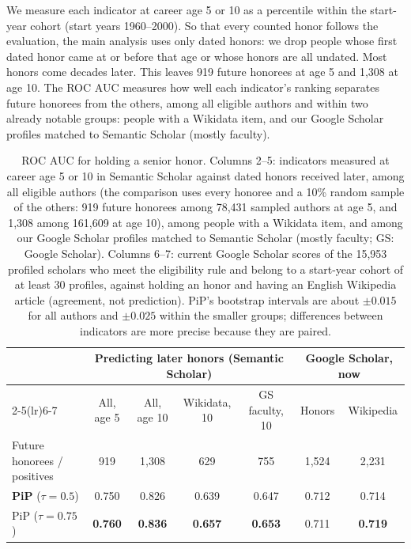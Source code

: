 \documentclass[11pt]{article}
\begin{document}
We measure each indicator at career age 5 or 10 as a percentile within the start-year cohort (start years 1960--2000).
So that every counted honor follows the evaluation, the main analysis uses only dated honors: we drop people whose
first dated honor came at or before that age or whose honors are all undated. Most honors come decades later. This
leaves 919 future honorees at age 5 and 1,308 at age 10. The ROC AUC measures how well each indicator's ranking
separates future honorees from the others, among all eligible authors and within two already notable groups: people
with a Wikidata item, and our Google Scholar profiles matched to Semantic Scholar (mostly faculty).

\begin{table}[t]
  \centering
  \small
  \caption{ROC AUC for holding a senior honor. Columns 2--5: indicators measured at career age 5 or 10 in Semantic
  Scholar against dated honors received later, among all eligible authors (the comparison uses every honoree and a 10\%
  random sample of the others: 919 future honorees among 78,431 sampled authors at age 5, and 1,308 among 161,609 at
  age 10), among people with a Wikidata item, and among our Google Scholar profiles matched to
  Semantic Scholar (mostly faculty; GS: Google Scholar). Columns 6--7: current Google Scholar scores of the 15,953
  profiled scholars who meet the eligibility rule and belong to a start-year cohort of at least 30 profiles, against
  holding an honor and having an English Wikipedia article (agreement, not prediction). PiP's bootstrap intervals are
  about $\pm 0.015$ for all authors and $\pm 0.025$ within the smaller groups; differences between indicators are
  more precise because they are paired.}
  \label{tab:honors}
  \setlength{\tabcolsep}{4.5pt}
  \begin{tabular}{lcccccc}
    \toprule
    & \multicolumn{4}{c}{Predicting later honors (Semantic Scholar)} & \multicolumn{2}{c}{Google Scholar, now} \\
    \cmidrule(lr){2-5}\cmidrule(lr){6-7}
    & All, age 5 & All, age 10 & Wikidata, 10 & GS faculty, 10 & Honors & Wikipedia \\
    Future honorees / positives & 919 & 1,308 & 629 & 755 & 1,524 & 2,231 \\
    \midrule
    \textbf{PiP} ($\tau = 0.5$) & 0.750 & 0.826 & 0.639 & 0.647 & 0.712 & 0.714 \\
    PiP ($\tau = 0.75$) & \textbf{0.760} & \textbf{0.836} & \textbf{0.657} & \textbf{0.653} & 0.711 & \textbf{0.719} \\

\end{tabular}
\end{table}
\end{document}
